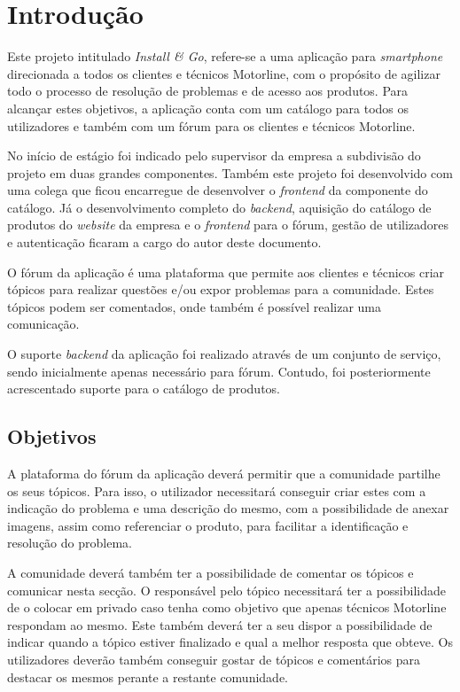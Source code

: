 
\chapter{Introdução}

Este projeto intitulado \textit{Install \& Go}, refere-se a uma aplicação para \textit{smartphone} direcionada a todos os clientes e 
técnicos Motorline, com o propósito de agilizar todo o processo de resolução de problemas e de acesso 
aos produtos. Para alcançar estes objetivos, a aplicação conta com um catálogo para todos os utilizadores 
e também com um fórum para os clientes e técnicos Motorline.

No início de estágio foi indicado pelo supervisor da empresa a subdivisão do projeto em duas grandes componentes. Também este projeto foi desenvolvido com uma colega que ficou encarregue de desenvolver o \textit{frontend} da componente do catálogo. Já o desenvolvimento completo do \textit{backend}, aquisição do catálogo de produtos do \textit{website} da empresa e o \textit{frontend} para o fórum, gestão de utilizadores e autenticação ficaram a cargo do autor deste documento.

O fórum da aplicação é uma plataforma que permite aos clientes e técnicos criar tópicos para realizar questões e/ou expor problemas para a comunidade. Estes tópicos podem ser comentados, onde também é possível realizar uma comunicação.

O suporte \textit{backend} da aplicação foi realizado através de um conjunto de serviço, sendo inicialmente apenas necessário para fórum. Contudo, foi posteriormente acrescentado suporte para o catálogo de produtos.

\newpage

\section{Objetivos}
A plataforma do fórum da aplicação deverá permitir que a comunidade partilhe os seus tópicos. Para isso, o utilizador necessitará conseguir criar estes com a indicação do problema e uma descrição do mesmo, com a possibilidade de anexar imagens, assim como referenciar o produto, para facilitar a identificação e resolução do problema.

A comunidade deverá também ter a possibilidade de comentar os tópicos e comunicar nesta secção. O responsável pelo tópico necessitará ter a possibilidade de o colocar em privado caso tenha como objetivo que apenas técnicos Motorline respondam ao mesmo. Este também deverá ter a seu dispor a possibilidade de indicar quando a tópico estiver finalizado e qual a melhor resposta que obteve. Os utilizadores deverão também conseguir gostar de tópicos e comentários para destacar os mesmos perante a restante comunidade.


